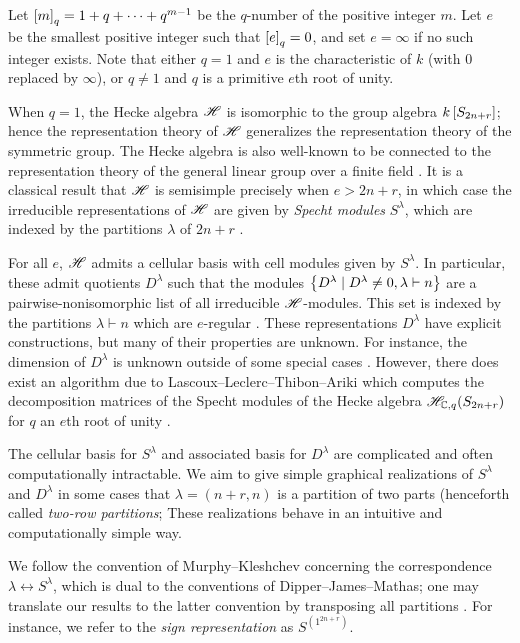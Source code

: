 \documentclass{amsart}
\begin{document}
  Let $\left[ m \right]_q = 1 + q + \dots + q^{m-1}$ be the $q$-number of the positive integer $m$. 
  Let $e$ be the smallest positive integer such that $\left[ e \right]_q = 0$, and set $e = \infty$ if no such integer exists.
  Note that either $q = 1$ and $e$ is the characteristic of $k$ (with $0$ replaced by $\infty$), or $q \neq 1$ and $q$ is a primitive $e$th root of unity.

  \vspace{5pt}
  When $q = 1$, the Hecke algebra $\mathscr{H}$ is isomorphic to the group algebra $k\left[ S_{2n+r} \right]$;
  hence the representation theory of $\mathscr{H}$ generalizes the representation theory of the symmetric group.
  The Hecke algebra is also well-known to be connected to the representation theory of the general linear group over a finite field \cite{Mathas-book}.
  It is a classical result that $\mathscr{H}$ is semisimple precisely when $e > 2n + r$, in which case the irreducible representations of $\mathscr{H}$ are given by \emph{Specht modules} $S^\lambda$, which are indexed by the partitions $\lambda$ of $2n + r$ \cite{Mathas-book}.
  
  For all $e$, $\mathscr{H}$ admits a cellular basis with cell modules given by $S^\lambda$.
  In particular, these admit quotients $D^\lambda$ such that the modules $\left\{ D^\lambda \mid D^\lambda \neq 0, \lambda \vdash n \right\}$ are a pairwise-nonisomorphic list of all irreducible $\mathscr{H}$-modules.
  This set is indexed by the partitions $\lambda \vdash n$ which are $e$-regular \cite{Murphy1,Murphy2}.
  These representations $D^\lambda$ have explicit constructions, but many of their properties are unknown.
  For instance, the dimension of $D^\lambda$ is unknown outside of some special cases \cite{Mathas-book}.
  However, there does exist an algorithm due to Lascoux--Leclerc--Thibon--Ariki which computes the decomposition matrices of the Specht modules of the Hecke algebra $\mathscr{H}_{\mathbb{C},q}(S_{2n + r})$ for $q$ an $e$th root of unity \cite{LLT,Ariki}.
  
  The cellular basis for $S^\lambda$ and associated basis for $D^\lambda$ are complicated and often computationally intractable.
  We aim to give simple graphical realizations of $S^\lambda$ and $D^\lambda$ in some cases that $\lambda = (n+r,n)$ is a partition of two parts (henceforth called \emph{two-row partitions};
  These realizations behave in an intuitive and computationally simple way.

  \begin{remark}
    We follow the convention of Murphy--Kleshchev concerning the correspondence $\lambda \leftrightarrow S^\lambda$, which is dual to the conventions of Dipper--James--Mathas;
    one may translate our results to the latter convention by transposing all partitions \cite{Kleshchev,Mathas-book,Murphy1}. 
    For instance, we refer to the \emph{sign representation} as $S^{(1^{2n + r})}$.
  \end{remark}
\end{document}
